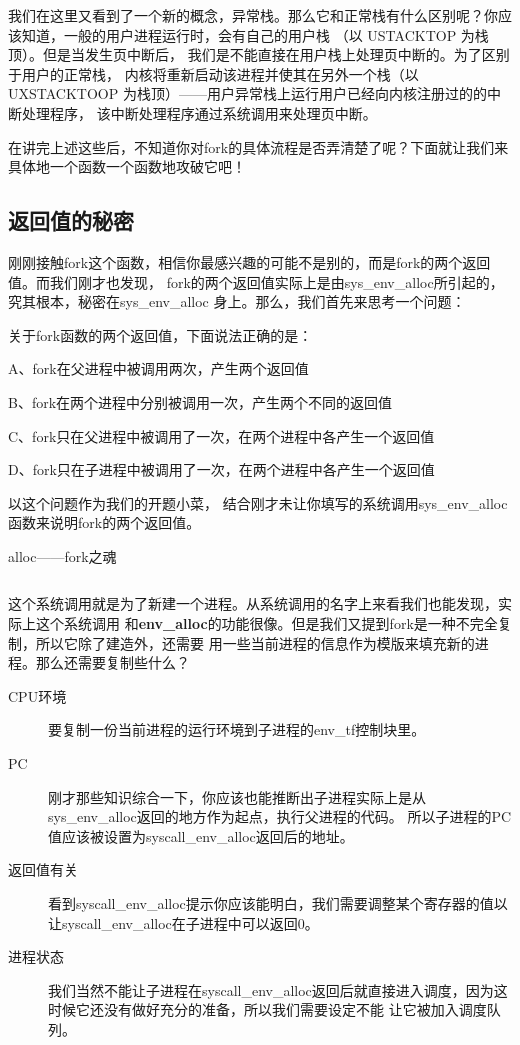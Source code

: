

我们在这里又看到了一个新的概念，异常栈。那么它和正常栈有什么区别呢？你应该知道，一般的用户进程运行时，会有自己的用户栈
（以 USTACKTOP 为栈顶）。但是当发生页中断后， 我们是不能直接在用户栈上处理页中断的。为了区别于用户的正常栈，
内核将重新启动该进程并使其在另外一个栈（以 UXSTACKTOOP 为栈顶）——用户异常栈上运行用户已经向内核注册过的的中断处理程序，
该中断处理程序通过系统调用来处理页中断。

在讲完上述这些后，不知道你对fork的具体流程是否弄清楚了呢？下面就让我们来具体地一个函数一个函数地攻破它吧！

\subsection{返回值的秘密}

刚刚接触fork这个函数，相信你最感兴趣的可能不是别的，而是fork的两个返回值。而我们刚才也发现，
fork的两个返回值实际上是由sys\_env\_alloc所引起的，究其根本，秘密在sys\_env\_alloc
身上。那么，我们首先来思考一个问题：

\begin{thinking}\label{think:fork的调用}
 关于fork函数的两个返回值，下面说法正确的是：
 
  A、fork在父进程中被调用两次，产生两个返回值
  
  B、fork在两个进程中分别被调用一次，产生两个不同的返回值
  
  C、fork只在父进程中被调用了一次，在两个进程中各产生一个返回值
  
  D、fork只在子进程中被调用了一次，在两个进程中各产生一个返回值
\end{thinking}

以这个问题作为我们的开题小菜，
结合刚才未让你填写的系统调用sys\_env\_alloc函数来说明fork的两个返回值。

\begin{codeBoxWithCaption}{alloc——fork之魂\label{code:sys_env_alloc.c}}
  \inputminted[linenos]{c}{codes/sys_env_alloc.c}
\end{codeBoxWithCaption}

这个系统调用就是为了新建一个进程。从系统调用的名字上来看我们也能发现，实际上这个系统调用
和\textbf{env\_alloc}的功能很像。但是我们又提到fork是一种不完全复制，所以它除了建造外，还需要
用一些当前进程的信息作为模版来填充新的进程。那么还需要复制些什么？

\begin{description}
 \item [CPU环境] 要复制一份当前进程的运行环境到子进程的env\_tf控制块里。
 \item [PC] 刚才那些知识综合一下，你应该也能推断出子进程实际上是从sys\_env\_alloc返回的地方作为起点，执行父进程的代码。
 所以子进程的PC值应该被设置为syscall\_env\_alloc返回后的地址。
 \item [返回值有关] 看到syscall\_env\_alloc提示你应该能明白，我们需要调整某个寄存器的值以让syscall\_env\_alloc在子进程中可以返回0。
 \item [进程状态] 我们当然不能让子进程在syscall\_env\_alloc返回后就直接进入调度，因为这时候它还没有做好充分的准备，所以我们需要设定不能
 让它被加入调度队列。
 \end{description}

